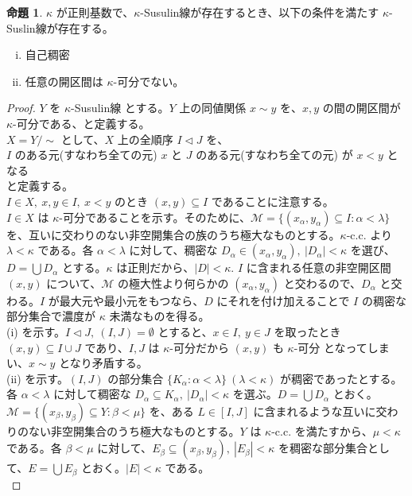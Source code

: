 \documentclass{jsarticle}
\theoremstyle{definition}
\newtheorem{proposition}[theorem]{命題}
\begin{document}
    \begin{proposition}
        $\kappa$ が正則基数で、$\kappa$-Susulin線が存在するとき、以下の条件を満たす $\kappa$-Suslin線が存在する。
        \begin{enumerate}[(i)]
            \item 自己稠密
            \item 任意の開区間は $\kappa$-可分でない。
        \end{enumerate}
    \end{proposition}
    \begin{proof}
        $Y$ を $\kappa$-Susulin線 とする。$Y$ 上の同値関係 $x \sim y$ を、$x, y$ の間の開区間が $\kappa$-可分である、と定義する。\\
        $X = Y/\sim$ として、$X$ 上の全順序 $I \lhd J$ を、\\
        $I$ のある元(すなわち全ての元) $x$ と $J$ のある元(すなわち全ての元) が $x < y$ となる\\
        と定義する。\\
        $I \in X, \ x, y \in I, \ x<y$ のとき $(x, y) \subseteq I$ であることに注意する。\\
        $I \in X$ は $\kappa$-可分であることを示す。そのために、$\mathcal{M} = \{ (x_\alpha, y_\alpha) \subseteq I : \alpha < \lambda\}$ を、互いに交わりのない非空開集合の族のうち極大なものとする。$\kappa$-c.c. より $\lambda < \kappa$ である。各 $\alpha < \lambda$ に対して、稠密な $D_\alpha \in (x_\alpha, y_\alpha), \ |D_\alpha| < \kappa$ を選び、$D = \bigcup D_\alpha$ とする。$\kappa$ は正則だから、$|D| < \kappa$. $I$ に含まれる任意の非空開区間 $(x, y)$ について、$\mathcal{M}$ の極大性より何らかの $(x_\alpha, y_\alpha)$ と交わるので、$D_\alpha$ と交わる。$I$ が最大元や最小元をもつなら、$D$ にそれを付け加えることで $I$ の稠密な部分集合で濃度が $\kappa$ 未満なものを得る。\\
        (i) を示す。$I \lhd J, \ (I, J) = \emptyset$ とすると、$x \in I, \ y \in J$ を取ったとき $(x, y) \subseteq I \cup J$ であり、$I, J$ は $\kappa$-可分だから $(x, y)$ も $\kappa$-可分 となってしまい、$x \sim y$ となり矛盾する。\\
        (ii) を示す。$(I, J)$ の部分集合 $\{K_\alpha : \alpha < \lambda\} \ (\lambda < \kappa)$ が稠密であったとする。各 $\alpha < \lambda$ に対して稠密な $D_\alpha \subseteq K_\alpha, \ |D_\alpha| < \kappa$ を選ぶ。$D = \bigcup D_\alpha$ とおく。\\
        $\mathcal{M} = \{(x_\beta, y_\beta) \subseteq Y : \beta < \mu\}$ を、ある $L \in [I, J]$ に含まれるような互いに交わりのない非空開集合のうち極大なものとする。$Y$ は $\kappa$-c.c. を満たすから、$\mu < \kappa$ である。各 $\beta < \mu$ に対して、$E_\beta \subseteq (x_\beta, y_\beta), \ |E_\beta| < \kappa$ を稠密な部分集合として、$E = \bigcup E_\beta$ とおく。$|E| < \kappa$ である。\\

\end{proof}
\end{document}
